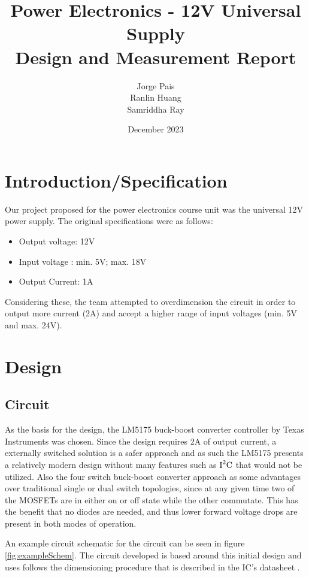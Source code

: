 \documentclass[11pt, a4paper]{article}
\title{Power Electronics - 12V Universal Supply \\ Design and Measurement Report}
\author{Jorge Pais \\ Ranlin Huang \\ Samriddha Ray }
\date{December 2023}
\begin{document}
\maketitle
\vfill \pagebreak
\tableofcontents
\vfill \pagebreak

\section{Introduction/Specification}

Our project proposed for the power electronics course unit was the universal 12V power supply. The original specifications were as follows:

\begin{itemize}
    \item Output voltage: 12V
    \item Input voltage : min. 5V; max. 18V
    \item Output Current: 1A 
\end{itemize}

Considering these, the team attempted to overdimension the circuit in order to output more current (2A) and accept a higher range of input voltages (min. 5V and max. 24V).

\section{Design}

\subsection{Circuit}

As the basis for the design, the LM5175 buck-boost converter controller by Texas Instruments \cite{lm7175data} was chosen. Since the design requires 2A of output current, a externally switched solution is a safer approach and as such the LM5175 presents a relatively modern design without many features such as $\text I^2\text C$ that would not be utilized. Also the four switch buck-boost converter approach as some advantages over traditional single or dual switch topologies, since at any given time two of the MOSFETs are in either on or off state while the other commutate. This has the benefit that no diodes are needed, and thus lower forward voltage drops are present in both modes of operation.

An example circuit schematic for the circuit can be seen in figure \ref{fig:exampleSchem}. The circuit developed is based around this initial design and uses follows the dimensioning procedure that is described in the IC's datasheet \cite{lm7175data}.
\end{document}

